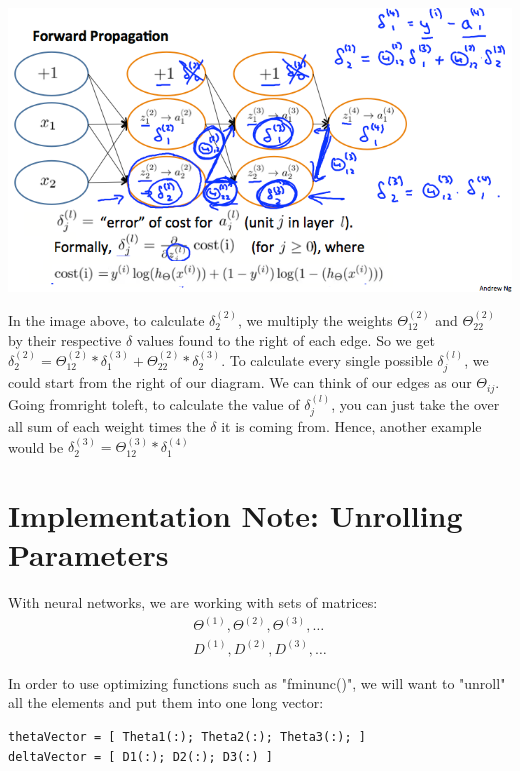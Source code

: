 \documentclass[10pt,a4paper,UTF8]{article}
\begin{document}
\begin{center}
\includegraphics[width=.9\linewidth]{../../img/computer_ng/20171014BP2.png}
\end{center}

In the image above, to calculate \(\delta_{2}^{(2)}\), we multiply the weights \(\Theta_{12}^{(2)}\) and \(\Theta_{22}^{(2)}\) by their respective \(\delta\) values found to the right of each edge. So we get \(\delta_{2}^{(2)} = \Theta_{12}^{(2)}*\delta_{1}^{(3)} + \Theta_{22}^{(2)}*\delta_{2}^{(3)}\). To calculate every single possible \(\delta_{j}^{(l)}\), we could start from the right of our diagram. We can think of our edges as our \(\Theta_{ij}\). Going fromright toleft, to calculate the value of \(\delta_{j}^{(l)}\), you can just take the over all sum of each weight times the \(\delta\) it is coming from. Hence, another example would be \(\delta_{2}^{(3)} = \Theta_{12}^{(3)}*\delta_{1}^{(4)}\)
\section{Implementation Note: Unrolling Parameters}
\label{sec:orge9f1821}


With neural networks, we are working with sets of matrices:
\begin{align*} \Theta^{(1)}, \Theta^{(2)}, \Theta^{(3)}, \dots \\ D^{(1)}, D^{(2)}, D^{(3)}, \dots \end{align*}

In order to use optimizing functions such as "fminunc()", we will want to "unroll" all the elements and put them into one long vector:

\lstset{language=matlab,label= ,caption= ,captionpos=b,numbers=none}
\begin{lstlisting}
thetaVector = [ Theta1(:); Theta2(:); Theta3(:); ]
deltaVector = [ D1(:); D2(:); D3(:) ]
\end{lstlisting}
\end{document}
